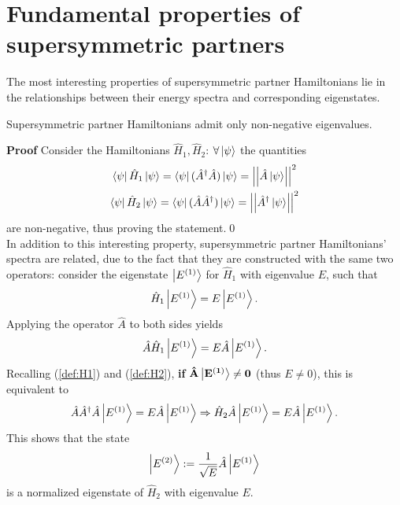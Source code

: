 \section{Fundamental properties of supersymmetric partners}
The most interesting properties of supersymmetric partner Hamiltonians lie in the
relationships between their energy spectra and corresponding eigenstates.

\begin{thm}
Supersymmetric partner Hamiltonians admit only non-negative eigenvalues.
\end{thm}
\textbf{Proof} Consider the Hamiltonians $\hat H_1, \hat H_2$: $\forall\ket{\psi}$ the
quantities
\begin{gather*}
\bra{\psi}\hat H_1\ket{\psi} = \bra{\psi}(\hat A^\dagger\hat A)\ket{\psi} = 
\left|\left| \hat A \ket{\psi} \right|\right|^2\\
\bra{\psi}\hat H_2\ket{\psi} = \bra{\psi}(\hat A\hat A^\dagger)\ket{\psi} = 
\left|\left| \hat A^\dagger \ket{\psi} \right|\right|^2
\end{gather*}
are non-negative, thus proving the statement.\qed\\

In addition to this interesting property, supersymmetric partner Hamiltonians' spectra are
related, due to the fact that they are constructed with the same two operators:
consider the eigenstate $\ket{E^{(1)}}$ for $\hat H_1$ with eigenvalue $E$,
such that
$$\hat H_1 \ket{E^{(1)}} = E \ket{E^{(1)}}.$$
Applying the operator $\hat A$ to both sides yields
$$\hat A\hat H_1\ket{E^{(1)}} = E\hat A\ket{E^{(1)}}.$$
Recalling (\ref{def:H1}) and (\ref{def:H2}),
\textbf{if} $\mathbf{\hat A\ket{E^{(1)}}\neq0}$ (thus $E\neq0$), this is
equivalent to
$$\hat A\hat A^\dagger\hat A\ket{E^{(1)}} = E \hat A \ket{E^{(1)}}
\Rightarrow \hat H_2\hat A \ket{E^{(1)}} =
E\hat A\ket{E^{(1)}}.$$
This shows that the state
\begin{equation}
    \ket{{E^{(2)}}} :=\frac{1}{\sqrt{E}}\hat A\ket{E^{(1)}}
\label{eq:A_use}
\end{equation}
is a normalized eigenstate of $\hat H_2$ with eigenvalue $E$.

